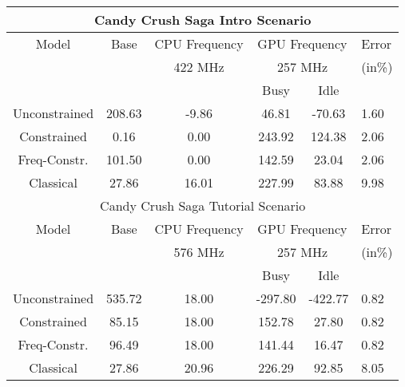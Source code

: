 \begin{table}[]
{\begin{tabular}{|c|c|c|c|c|p{5.4mm}|}
    \multicolumn{6}{|c|}{Candy Crush Saga Intro Scenario} \\
        \hline
        Model & Base & \multicolumn{1}{c|}{CPU Frequency} & \multicolumn{2}{c|}{GPU Frequency} & Error \\
        \cline{3-5}
        &  & 422 MHz & \multicolumn{2}{c|}{257 MHz} & (in\%)\\
        \cline{3-5}
                & & \multicolumn{1}{|c|}{} & Busy & Idle & \\
        \hline
        Unconstrained & 208.63 & -9.86 & 46.81 & -70.63 & 1.60 \\
        Constrained & 0.16 & 0.00 & 243.92 & 124.38 & 2.06 \\
        Freq-Constr. & 101.50 & 0.00 & 142.59 & 23.04 & 2.06 \\
        \hline
        Classical & 27.86 & 16.01 & 227.99 & 83.88 & 9.98 \\
        \hline
        
    \multicolumn{6}{|c|}{Candy Crush Saga Tutorial Scenario} \\
        \hline
        Model & Base & \multicolumn{1}{c|}{CPU Frequency} & \multicolumn{2}{c|}{GPU Frequency} & Error \\
        \cline{3-5}
        &  & 576 MHz & \multicolumn{2}{c|}{257 MHz} & (in\%) \\
        \cline{3-5}
                & & \multicolumn{1}{|c|}{} & Busy & Idle & \\
        \hline
        Unconstrained & 535.72 & 18.00 & -297.80 & -422.77 & 0.82 \\
        Constrained & 85.15 & 18.00 & 152.78 & 27.80 & 0.82 \\
        Freq-Constr. & 96.49 & 18.00 & 141.44 & 16.47 & 0.82 \\
        \hline
        Classical & 27.86 & 20.96 & 226.29 & 92.85 & 8.05 \\
        \hline
\end{tabular}
}
\label{tab:micro_a}
\vspace{-0.1in}
\end{table}

